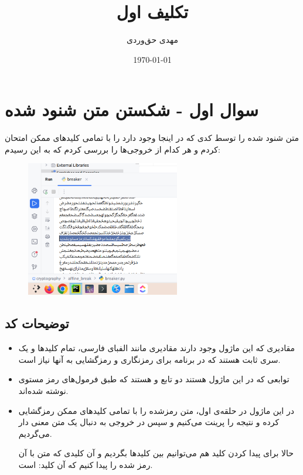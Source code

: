 \documentclass{article}
\title{تکلیف اول}
\author{مهدی حق‌وردی}
\date{\today}
\begin{document}
\maketitle
\tableofcontents

\section{سوال اول - شکستن متن شنود شده}
متن شنود شده را توسط کدی که در اینجا
وجود دارد را با تمامی کلید‌‌های ممکن امتحان کردم و هر کدام از خروجی‌ها را بررسی کردم که به این رسیدم:
\begin{figure}[H]
\begin{center}
\includegraphics[width=0.6\textwidth, height=0.4\textheight]{images/found}
\end{center}
\end{figure}

\subsection{توضیحات کد}

\begin{itemize}
\item 
{}

مقادیری که این ماژول وجود دارند مقادیری مانند الفبای فارسی، تمام کلید‌ها و یک سری ثابت هستند که در برنامه برای رمزنگاری و رمزگشایی به آنها نیاز است.

\item {}

توابعی که در این ماژول هستند دو تابع 
و
هستند که طبق فرمول‌های رمز مستوی نوشته شده‌اند.

\item {}

در این ماژول در حلقه‌ی 
اول، متن رمزشده را با تمامی کلید‌های ممکن رمزگشایی کرده و نتیجه را پرینت می‌کنیم و سپس در خروجی به دنبال یک متن معنی دار می‌گردیم.

حالا برای پیدا کردن کلید هم می‌توانیم بین کلید‌ها بگردیم و آن کلیدی که متن با آن رمز شده را پیدا کنیم که آن کلید:
است.
\end{itemize}
\end{document}
